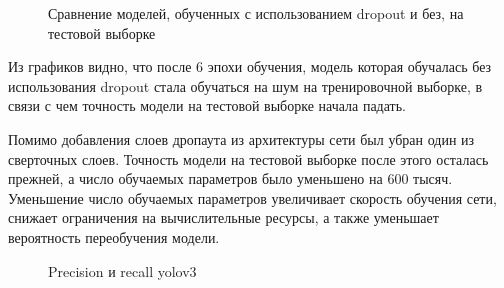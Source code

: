 \begin{figure}[H]
	\begin{center}
		\caption{Сравнение моделей, обученных с использованием dropout и без, на тестовой выборке}
		\label{img:dropout_test}
	\end{center}
\end{figure}

Из графиков видно, что после 6 эпохи обучения, модель которая обучалась без использования dropout стала обучаться на шум на тренировочной выборке, в связи с чем точность модели на тестовой выборке начала падать.

Помимо добавления слоев дропаута из архитектуры сети был убран один из сверточных слоев. Точность модели на тестовой выборке после этого осталась прежней, а число обучаемых параметров было уменьшено на 600 тысяч. Уменьшение число обучаемых параметров увеличивает скорость обучения сети, снижает ограничения на вычислительные ресурсы, а также уменьшает вероятность переобучения модели.


\begin{figure}[H]
	\begin{center}
		\caption{Precision и recall yolov3}
		\label{img:yolov3_precision_recall}
	\end{center}
\end{figure}


